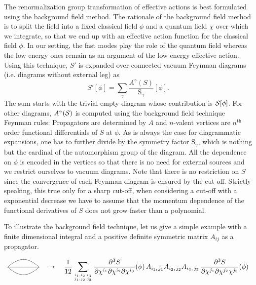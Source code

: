 \documentclass[10pt,here,feynmf]{article}
\begin{document}
The renormalization group transformation of  effective actions is best formulated using the background field method. The rationale of the background field method is to split the field into a fixed classical field $\phi$ and a quantum field $\chi$ over which we integrate, so that we end up with an effective action function for the classical field $\phi$. In our setting, the fast modes play the role of the quantum field whereas the low energy ones remain as an argument of the low energy effective action. Using this technique, $S'$ is expanded over connected vacuum Feynman diagrams (i.e. diagrams without external leg) as
\begin{equation}
S'[\phi]=\sum_{\gamma}\frac{A^{\gamma}(S)}{\mbox{
S}_{\gamma}}[\phi].
\end{equation}
The sum starts with the trivial empty diagram whose contribution is $\cal{S}[ \phi]$. For other diagrams, $A^{\gamma}(\cal S)$ is computed using the background field
technique Feynman rules: Propagators are determined by $A$ and $n$-valent vertices are $n^{\mathrm{th}}$ order functional differentials of $S$ at $\phi$.
As is always the case for diagrammatic expansions, one has to further divide by the symmetry factor $\mathrm{S}_{\gamma}$, which is nothing but the cardinal of the automorphism group of the diagram. All the dependence on $\phi$ is encoded in the vertices so that there is no need for external sources and we restrict ourselves to vacuum diagrams. Note that there is no restriction on $S$  since the convergence of each Feynman diagram is ensured by the cut-off.  Strictly speaking, this true only for a sharp cut-off, when considering a cut-off with a exponential decrease we have to assume that the momentum dependence of the functional derivatives of $S$ does not grow faster than a polynomial.


To illustrate the background field technique, let us give a simple example with a finite dimensional integral and a positive definite symmetric matrix $A_{ij}$ as a propagator.

\[
\xy
(0,0)*{}="A"; 
(16,0)*{}="B"; 
"A"; "B" **\crv{(0,0)&(8,8)&(16,0)};
"A"; "B" **\crv{(0,0)&(16,0)};
"A"; "B" **\crv{(0,0)&(8,-8)&(16,0)};
\endxy
\quad\rightarrow\quad
\frac{1}{12}
\sum_{i_{1},i_{2},i_{3}\atop
j_{1},j_{2},j_{3}}
\frac{\partial^{3}S}{\partial\chi^{i_{1}}\partial\chi^{i_{2}}\partial\chi^{i_{3}}}(\phi)\,
A_{i_{1},\,j_{1}}A_{i_{2},\,j_{2}}A_{i_{3},\,j_{3}}\,
\frac{\partial^{3}S}{\partial \chi^{j_{1}}\partial\chi^{j_{2}}\chi^{j_{3}}}(\phi)
\] 
 
 
 
\end{document}
